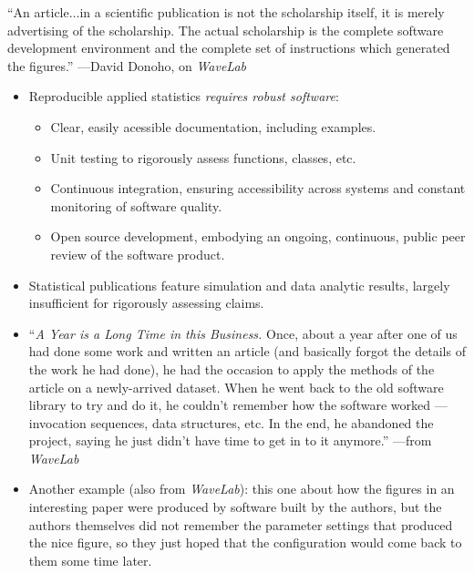   ``An article$\ldots$in a scientific publication is not the scholarship itself,
  it is merely advertising of the scholarship. The actual scholarship is the
  complete software development environment and the complete set of instructions
  which generated the figures.'' ---David Donoho, on \textit{WaveLab}

\begin{itemize}
  \item Reproducible applied statistics \textit{requires robust software}:
    \begin{itemize}
      \itemsep4pt
      \item Clear, easily acessible documentation, including examples.
      \item Unit testing to rigorously assess functions, classes, etc.
      \item Continuous integration, ensuring accessibility across systems and
        constant monitoring of software quality.
      \item Open source development, embodying an ongoing, continuous, public
        peer review of the software product.
    \end{itemize}
\end{itemize}

\begin{itemize}
  \itemsep4pt
  \item Statistical publications feature simulation and data analytic results,
    largely insufficient for rigorously assessing claims.
  \item ``\textit{A Year is a Long Time in this Business.} Once, about a year
    after one of us had done some work and written an article (and basically
    forgot the details of the work he had done), he had the occasion to apply
    the methods of the article on a newly-arrived dataset. When he went back to
    the old software library to try and do it, he couldn't remember how the
    software worked --- invocation sequences, data structures, etc. In the end,
    he abandoned the project, saying he just didn't have time to get in to it
    anymore.'' ---from \textit{WaveLab}
  \item Another example (also from \textit{WaveLab}): this one about how the
    figures in an interesting paper were produced by software built by the
    authors, but the authors themselves did not remember the parameter settings
    that produced the nice figure, so they just hoped that the configuration
    would come back to them some time later.
\end{itemize}


